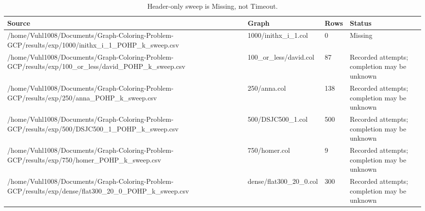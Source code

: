 \begin{table}[htbp]
\centering
\caption{Header-only sweep is Missing, not Timeout.}
\label{tab:p3-coverage}
\begin{tabular}{llll}
\hline
Source & Graph & Rows & Status \\
\hline
/home/Vuhl1008/Documents/Graph-Coloring-Problem-GCP/results/exp/1000/inithx\_i\_1\_POHP\_k\_sweep.csv & 1000/inithx\_i\_1.col & 0 & Missing \\
/home/Vuhl1008/Documents/Graph-Coloring-Problem-GCP/results/exp/100\_or\_less/david\_POHP\_k\_sweep.csv & 100\_or\_less/david.col & 87 & Recorded attempts; completion may be unknown \\
/home/Vuhl1008/Documents/Graph-Coloring-Problem-GCP/results/exp/250/anna\_POHP\_k\_sweep.csv & 250/anna.col & 138 & Recorded attempts; completion may be unknown \\
/home/Vuhl1008/Documents/Graph-Coloring-Problem-GCP/results/exp/500/DSJC500\_1\_POHP\_k\_sweep.csv & 500/DSJC500\_1.col & 500 & Recorded attempts; completion may be unknown \\
/home/Vuhl1008/Documents/Graph-Coloring-Problem-GCP/results/exp/750/homer\_POHP\_k\_sweep.csv & 750/homer.col & 9 & Recorded attempts; completion may be unknown \\
/home/Vuhl1008/Documents/Graph-Coloring-Problem-GCP/results/exp/dense/flat300\_20\_0\_POHP\_k\_sweep.csv & dense/flat300\_20\_0.col & 300 & Recorded attempts; completion may be unknown \\
\hline
\end{tabular}
\end{table}
